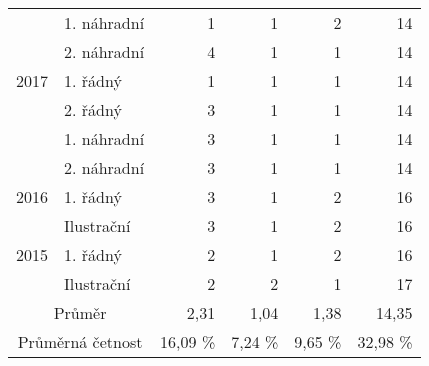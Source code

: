 \begin{table}[p]
\begin{center}
\begin{tabular}{|l|l|r|r|r|r|}
			\multicolumn{ 1}{|l|}{} & 1. náhradní  & 1 & 1 & 2 & 14 \\ \cline{ 2- 6}
			\multicolumn{ 1}{|l|}{} & 2. náhradní  & 4 & 1 & 1 & 14 \\ \hline
			\multicolumn{ 1}{|c|}{2017} & 1. řádný  & 1 & 1 & 1 & 14 \\ \cline{ 2- 6}
			\multicolumn{ 1}{|l|}{} & 2. řádný  & 3 & 1 & 1 & 14 \\ \cline{ 2- 6}
			\multicolumn{ 1}{|l|}{} & 1. náhradní  & 3 & 1 & 1 & 14 \\ \cline{ 2- 6}
			\multicolumn{ 1}{|l|}{} & 2. náhradní  & 3 & 1 & 1 & 14 \\ \hline
			\multicolumn{ 1}{|c|}{2016} & 1. řádný  & 3 & 1 & 2 & 16 \\ \cline{ 2- 6}
			\multicolumn{ 1}{|l|}{} & Ilustrační & 3 & 1 & 2 & 16 \\ \hline
			\multicolumn{ 1}{|c|}{2015} & 1. řádný  & 2 & 1 & 2 & 16 \\ \cline{ 2- 6}
			\multicolumn{ 1}{|l|}{} & Ilustrační & 2 & 2 & 1 & 17 \\ \hline
			\multicolumn{ 2}{|c|}{Průměr} & 2,31 & 1,04 & 1,38 & 14,35 \\ \hline
			\multicolumn{ 2}{|c|}{Průměrná četnost} & 16,09 \% & 7,24 \% & 9,65 \% & 32,98 \% \\ \hline
		\end{tabular}
	\end{center}
	\label{tab:8ulo}
\end{table}

